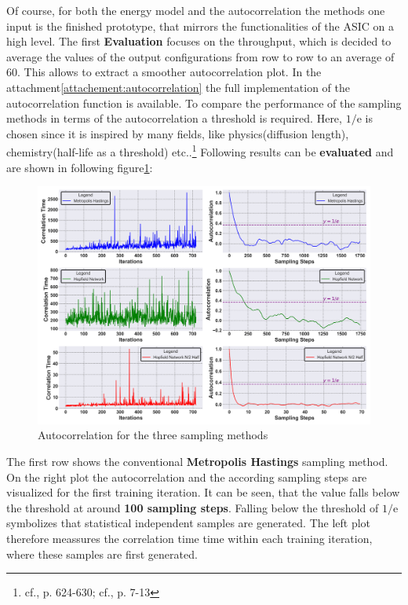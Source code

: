 Of course, for both the energy model and the autocorrelation the methods one input is the finished prototype, that mirrors the functionalities of the \ac{ASIC} on a high level.
The first \textbf{Evaluation} focuses on the throughput, which is decided to average the values of the output configurations from row to row to an average of 60.
This allows to extract a smoother autocorrelation plot.
In the attachment\ref{attachement:autocorrelation} the full implementation of the autocorrelation function is available.
To compare the performance of the sampling methods in terms of the autocorrelation a threshold is required. 
Here, \(1/\mathrm{e}\) is chosen since it is inspired by many fields, like physics(diffusion length), chemistry(half-life as a threshold) etc..\footnote{cf.\cite{archieStatisticalAnalysisHeterozygosity1985}, p. 624-630; cf.\cite{bohmNoiseinjectedAnalogIsing2022}, p. 7-13}
Following results can be \textbf{evaluated} and are shown in following figure\ref{Autocorr comparison}:
\begin{figure}[H]
    \centering
    \includegraphics[width=0.95\linewidth]{graphics/Visualisierungen_Autocorr_individual_7.png}
    \caption{Autocorrelation for the three sampling methods}
    \label{Autocorr comparison}
\end{figure}
The first row shows the conventional \textbf{Metropolis Hastings} sampling method. On the right plot the autocorrelation
and the according sampling steps are visualized for the first training iteration.
It can be seen, that the value falls below the threshold at around \textbf{100 sampling steps}.
Falling below the threshold of \(1/\mathrm{e}\) symbolizes that statistical independent samples are generated.
The left plot therefore meassures the correlation time time within each training iteration, where these samples are first generated. 
